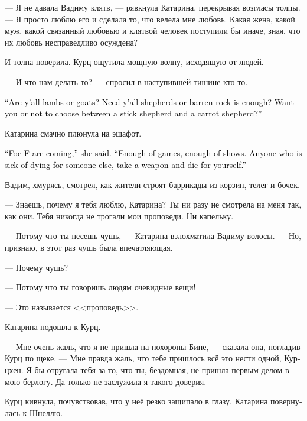 \documentclass[a4paper,12pt,fleqn]{book}\usepackage{cooltooltips}\usepackage{polyglossia}\setdefaultlanguage[babelshorthands=true]{russian}\setotherlanguage{english}\defaultfontfeatures{Ligatures=TeX,Mapping=tex-text} \usepackage{xcolor}\definecolor{lightgray}{HTML}{bbbbbb}\color{lightgray}\newcommand{\ml}[3]{\textenglish{\textcolor{black}{#3}}}
\newcommand{\textspace}{\vspace{1em}{\centering\Large\bfseries<...>\par}\vspace{1em}}
\begin{document}
--- Я не давала Вадиму клятв, --- рявкнула Катарина, перекрывая возгласы толпы.
--- Я просто люблю его и сделала то, что велела мне любовь.
Какая жена, какой муж, какой связанный любовью и клятвой человек поступили бы иначе, зная, что их любовь несправедливо осуждена?

И толпа поверила.
Курц ощутила мощную волну, исходящую от людей.

--- И что нам делать-то? --- спросил в наступившей тишине кто-то.

\ml{$0$}
{--- Овцы вы или козы?}
{``Are y'all lambs or goats?}
\ml{$0$}
{Нужен вам пастырь или достаточно бесплодной скалы?}
{Need y'all shepherds or barren rock is enough?}
\ml{$0$}
{Хотите ли вы выбирать между пастырем с кнутом и пастырем с морковкой?}
{Want you or not to choose between a stick shepherd and a carrot shepherd?''}

Катарина смачно плюнула на эшафот.

\ml{$0$}
{--- Фоу-Ф уже на подходах, --- сказала она.}
{``Foe-F are coming,'' she said.}
\ml{$0$}
{--- Хватит игр, хватит зрелищ.}
{``Enough of games, enough of shows.}
\ml{$0$}
{Кто не хочет умирать за чужие интересы, берите оружие и умрите за свои.}
{Anyone who is sick of dying for someone else, take a weapon and die for yourself.''}

\textspace

Вадим, хмурясь, смотрел, как жители строят баррикады из корзин, телег и бочек.

--- Знаешь, почему я тебя люблю, Катарина?
Ты ни разу не смотрела на меня так, как они.
Тебя никогда не трогали мои проповеди.
Ни капельку.

--- Потому что ты несешь чушь, --- Катарина взлохматила Вадиму волосы.
--- Но, признаю, в этот раз чушь была впечатляющая.

--- Почему чушь?

--- Потому что ты говоришь людям очевидные вещи!

--- Это называется <<проповедь>>.

Катарина подошла к Курц.

--- Мне очень жаль, что я не пришла на похороны Бине, --- сказала она, погладив Курц по щеке.
--- Мне правда жаль, что тебе пришлось всё это нести одной, Курцхен.
Я бы отругала тебя за то, что ты, бездомная, не пришла первым делом в мою берлогу.
Да только не заслужила я такого доверия.

Курц кивнула, почувствовав, что у неё резко защипало в глазу.
Катарина повернулась к Шнеллю.
\end{document}
